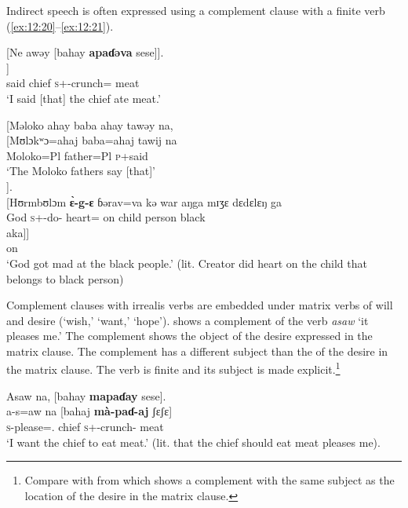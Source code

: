 Indirect speech is often expressed using a complement clause with a finite verb (\ref{ex:12:20}--\ref{ex:12:21}).

\ea \label{ex:12:20}
{}[Ne awəy  [bahay  \textbf{apaɗəva}  sese]].\\
\gll  [nɛ  awij   [bahaj  \textbf{à-paɗə}\textbf{=va}  ʃɛʃɛ]]\\
      {\oneS}  said  chief  \textsc{s}+{\PFV}-crunch={\PRF}  meat\\
\glt  ‘I said [that] the chief ate meat.’
\z 

\ea \label{ex:12:21}
{}[Məloko  ahay  baba  ahay  tawəy  na,\\  
\gll  {}[Mʊlɔkʷɔ=ahaj   baba=ahaj  tawij         na \\     
      Moloko=Pl      father=Pl     \textsc{p}+said    {\PSP}  \\    
\glt ‘The Moloko fathers say [that]’\\
      
].\\
\gll {}[Hʊrmbʊlɔm \textbf{\`ɛ-g-ɛ}  ɓərav=va kə war aŋga mɪʒɛ dɛdɛlɛŋ ga\\ 
     \hspaceThis{[}God \textsc{s}+{\PFV}-do-{\CL} heart={\PRF} on child {\POSS} person black  {\ADJ}\\ 
     
     \medskip
\gll aka]]\\
     on\\
\glt  ‘God got mad at the black people.’ (lit. Creator did heart on the child that belongs to black person)
\z 

Complement clauses with irrealis verbs are embedded under matrix verbs of will and desire (‘wish,’ ‘want,’ ‘hope’).    shows a complement of the verb \textit{asaw } ‘it pleases me.’ The complement shows the object of the desire expressed in the matrix clause. The complement has a different subject than the {\LOC} of the desire in the matrix clause. The verb is finite and its subject is made explicit.\footnote{Compare with  from  which shows a complement with the same subject as the location of the desire in the matrix clause.}  

\ea \label{ex:12:22}
Asaw  na,  [bahay  \textbf{mapaɗay} sese].\\
\gll  a-s=aw   na   [bahaj   \textbf{mà-paɗ-aj}     ʃɛʃɛ]\\
      \textsc{s}-please={\oneS}.{\IO}  {\PSP}  chief  \textsc{s}+{\HOR}{}-crunch{}-{\CL}  meat\\
\glt  ‘I want the chief to eat meat.’ (lit. that the chief should eat meat pleases me). 
\z 

